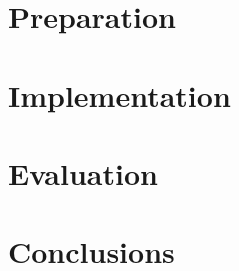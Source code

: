 \documentclass[a4paper, 12pt]{report}
\begin{document}
\chapter{Preparation}


\chapter{Implementation}


\chapter{Evaluation}


\chapter{Conclusions}





\end{document}
